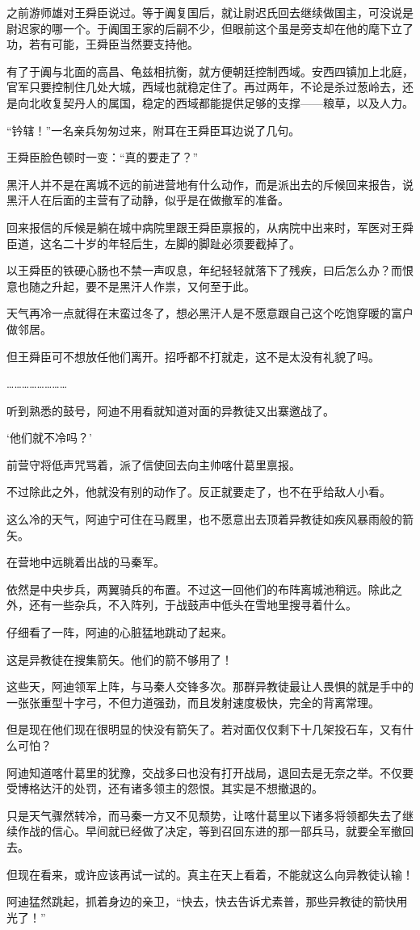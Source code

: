 之前游师雄对王舜臣说过。等于阗复国后，就让尉迟氏回去继续做国主，可没说是尉迟家的哪一个。于阗国王家的后嗣不少，但眼前这个虽是旁支却在他的麾下立了功，若有可能，王舜臣当然要支持他。

有了于阗与北面的高昌、龟兹相抗衡，就方便朝廷控制西域。安西四镇加上北庭，官军只要控制住几处大城，西域也就稳定住了。再过两年，不论是杀过葱岭去，还是向北收复契丹人的属国，稳定的西域都能提供足够的支撑——粮草，以及人力。

“钤辖！”一名亲兵匆匆过来，附耳在王舜臣耳边说了几句。

王舜臣脸色顿时一变：“真的要走了？”

黑汗人并不是在离城不远的前进营地有什么动作，而是派出去的斥候回来报告，说黑汗人在后面的主营有了动静，似乎是在做撤军的准备。

回来报信的斥候是躺在城中病院里跟王舜臣禀报的，从病院中出来时，军医对王舜臣道，这名二十岁的年轻后生，左脚的脚趾必须要截掉了。

以王舜臣的铁硬心肠也不禁一声叹息，年纪轻轻就落下了残疾，曰后怎么办？而恨意也随之升起，要不是黑汗人作祟，又何至于此。

天气再冷一点就得在末蛮过冬了，想必黑汗人是不愿意跟自己这个吃饱穿暖的富户做邻居。

但王舜臣可不想放任他们离开。招呼都不打就走，这不是太没有礼貌了吗。

……………………

听到熟悉的鼓号，阿迪不用看就知道对面的异教徒又出寨邀战了。

‘他们就不冷吗？’

前营守将低声咒骂着，派了信使回去向主帅喀什葛里禀报。

不过除此之外，他就没有别的动作了。反正就要走了，也不在乎给敌人小看。

这么冷的天气，阿迪宁可住在马厩里，也不愿意出去顶着异教徒如疾风暴雨般的箭矢。

在营地中远眺着出战的马秦军。

依然是中央步兵，两翼骑兵的布置。不过这一回他们的布阵离城池稍远。除此之外，还有一些杂兵，不入阵列，于战鼓声中低头在雪地里搜寻着什么。

仔细看了一阵，阿迪的心脏猛地跳动了起来。

这是异教徒在搜集箭矢。他们的箭不够用了！

这些天，阿迪领军上阵，与马秦人交锋多次。那群异教徒最让人畏惧的就是手中的一张张重型十字弓，不但力道强劲，而且发射速度极快，完全的背离常理。

但是现在他们现在很明显的快没有箭矢了。若对面仅仅剩下十几架投石车，又有什么可怕？

阿迪知道喀什葛里的犹豫，交战多曰也没有打开战局，退回去是无奈之举。不仅要受博格达汗的处罚，还有诸多领主的怨恨。其实是不想撤退的。

只是天气骤然转冷，而马秦一方又不见颓势，让喀什葛里以下诸多将领都失去了继续作战的信心。早间就已经做了决定，等到召回东进的那一部兵马，就要全军撤回去。

但现在看来，或许应该再试一试的。真主在天上看着，不能就这么向异教徒认输！

阿迪猛然跳起，抓着身边的亲卫，“快去，快去告诉尤素普，那些异教徒的箭快用光了！”
